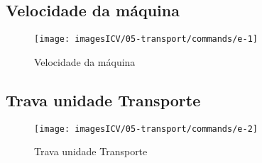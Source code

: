 \usepackage{graphicx}
\newpage
\thispagestyle{fancy}
\vspace{\fill}

\subsection{Velocidade da máquina}
\begin{figure}
    \centering
    \texttt{[image: imagesICV/05-transport/commands/e-1]}
    \caption{Velocidade da máquina}
\end{figure}
\newpage
\thispagestyle{fancy}
\vspace{\fill}

\subsection{Trava unidade Transporte}
\begin{figure}
    \centering
    \texttt{[image: imagesICV/05-transport/commands/e-2]}
    \caption{Trava unidade Transporte}
\end{figure}